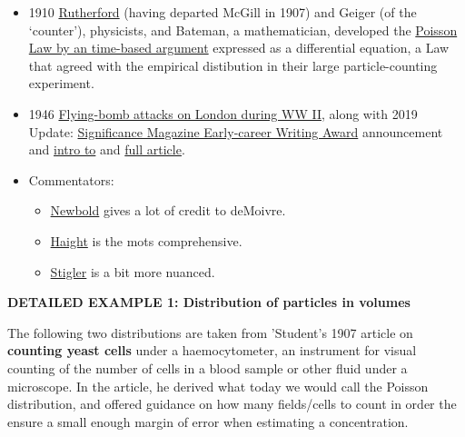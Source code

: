 \documentclass[]{book}
\providecommand{\tightlist}{%
  \setlength{\itemsep}{0pt}\setlength{\parskip}{0pt}}
\begin{document}
\begin{itemize}
\item
  1910 \href{https://www.physics.mcgill.ca/museum/rutherfordcollection.html}{Rutherford} (having departed McGill in 1907) and Geiger (of the `counter'), physicists, and Bateman, a mathematician, developed the \href{http://www.medicine.mcgill.ca/epidemiology/hanley/bios601/Intensity-Rate/RutherfordGeigerBateman1910.pdf}{Poisson Law by an time-based argument} expressed as a differential equation, a Law that agreed with the empirical distibution in their large particle-counting experiment.
\item
  1946 \href{https://www.actuaries.org.uk/system/files/documents/pdf/0481.pdf}{Flying-bomb attacks on London during WW II}, along with 2019 Update: \href{https://www.significancemagazine.com/10-news/627-finalists-announced-for-early-career-writing-award?highlight=WyJib21icyIsImJvbWJzJyJd}{Significance Magazine Early-career Writing Award} announcement and \href{https://www.significancemagazine.com/10-news/635-a-world-war-ii-investigation-updated-for-the-modern-era?highlight=WyJzaGF3Iiwic2hhdydzIl0=}{intro to} and \href{https://rss.onlinelibrary.wiley.com/doi/10.1111/j.1740-9713.2019.01315.x}{full article}.
\item
  Commentators:

  \begin{itemize}
  \tightlist
  \item
    \href{http://www.biostat.mcgill.ca/hanley/statbook/Newbold1927.pdf}{Newbold} gives a lot of credit to deMoivre.
  \item
    \href{http://www.biostat.mcgill.ca/hanley/statbook/HaightHistorical.pdf}{Haight} is the mots comprehensive.
  \item
    \href{http://www.biostat.mcgill.ca/hanley/statbook/StiglerPoisson.pdf}{Stigler} is a bit more nuanced.
  \end{itemize}
\end{itemize}

\textbf{DETAILED EXAMPLE 1: Distribution of particles in volumes}

The following two distributions are taken from 'Student's 1907 article on \textbf{counting yeast cells} under a haemocytometer, an instrument for visual counting of the number of cells in a blood sample or other fluid under a microscope. In the article, he derived what today we would call the Poisson distribution, and offered guidance on how many fields/cells to count in order the ensure a small enough margin of error when estimating a concentration.
\end{document}
